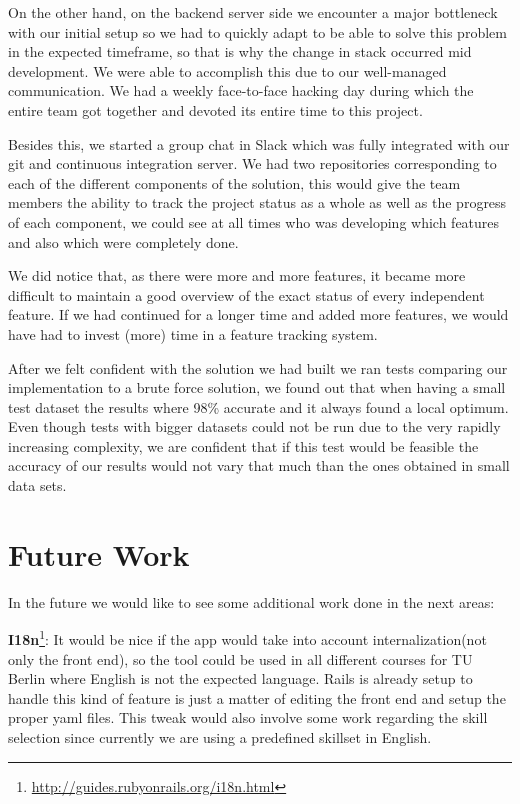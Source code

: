 On the other hand, on the backend server side we encounter a major bottleneck with our initial setup so we had to quickly adapt to be able to solve this problem in the expected timeframe, so that is why the change in stack occurred mid development. We were able to accomplish this due to our well-managed communication. We had a weekly face-to-face hacking day during which the entire team got together and devoted its entire time to this project.

Besides this, we started a group chat in Slack which was fully integrated with our git and continuous integration server. We had two repositories corresponding to each of the different components of the solution, this would give the team members the ability to track the project status as a whole as well as the progress of each component, we could see at all times who was developing which features and also which were completely done. 

We did notice that, as there were more and more features, it became more difficult to maintain a good overview of the exact status of every independent feature. If we had continued for a longer time and added more features, we would have had to invest (more) time in a feature tracking system.

After we felt confident with the solution we had built we ran tests comparing our implementation to a brute force solution, we found out that when having a small test dataset the results where 98\% accurate and it always found a local optimum. Even though tests with bigger datasets could not be run due to the very rapidly increasing complexity, we are confident that if this test would be feasible the accuracy of our results would not vary that much than the ones obtained in small data sets.

\section{Future Work}
In the future we would like to see some additional work done in the next areas:

\textbf{I18n}\footnote{\url{http://guides.rubyonrails.org/i18n.html}}: It would be nice if the app would take into account internalization(not only the front end), so the tool could be used in all different courses for TU Berlin where English is not the expected language. Rails is already setup to handle this kind of feature is just a matter of editing the front end and setup the proper yaml files. This tweak would also involve some work regarding the skill selection since currently we are using a predefined skillset in English.

